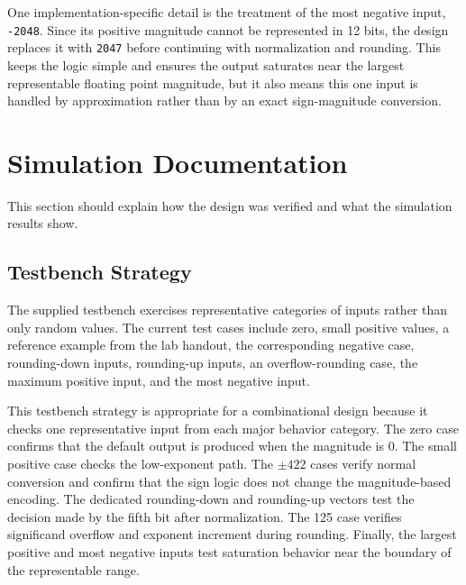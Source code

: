 \documentclass[10pt,letterpaper]{article}
\begin{document}
One implementation-specific detail is the treatment of the most negative input, \texttt{-2048}. Since its positive magnitude cannot be represented in 12 bits, the design replaces it with \texttt{2047} before continuing with normalization and rounding. This keeps the logic simple and ensures the output saturates near the largest representable floating point magnitude, but it also means this one input is handled by approximation rather than by an exact sign-magnitude conversion.

\section{Simulation Documentation}

This section should explain how the design was verified and what the simulation results show.

\subsection{Testbench Strategy}

The supplied testbench exercises representative categories of inputs rather than only random values. The current test cases include zero, small positive values, a reference example from the lab handout, the corresponding negative case, rounding-down inputs, rounding-up inputs, an overflow-rounding case, the maximum positive input, and the most negative input.

This testbench strategy is appropriate for a combinational design because it checks one representative input from each major behavior category. The zero case confirms that the default output is produced when the magnitude is 0. The small positive case checks the low-exponent path. The $\pm 422$ cases verify normal conversion and confirm that the sign logic does not change the magnitude-based encoding. The dedicated rounding-down and rounding-up vectors test the decision made by the fifth bit after normalization. The 125 case verifies significand overflow and exponent increment during rounding. Finally, the largest positive and most negative inputs test saturation behavior near the boundary of the representable range.
\end{document}
